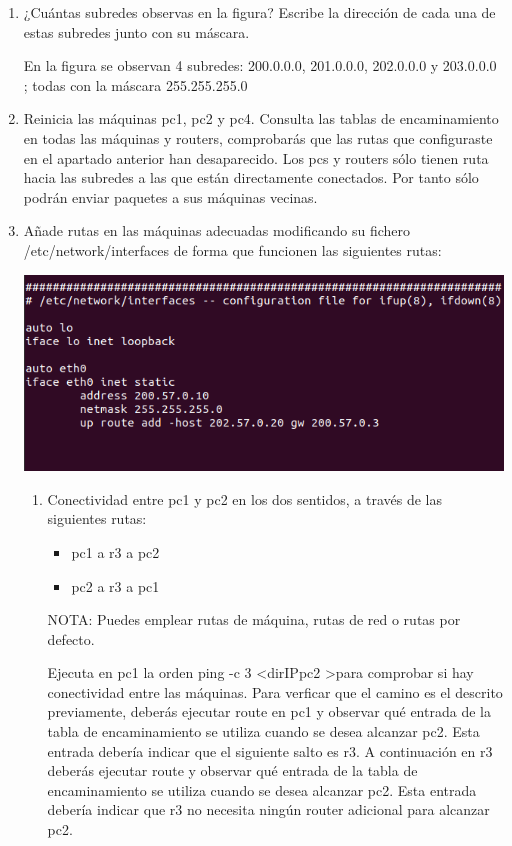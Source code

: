 \documentclass[12pt, a4paper]{report}
\begin{document}
\begin{enumerate}
	\item ¿Cuántas subredes observas en la figura? Escribe la dirección de cada una de estas subredes junto con su
	máscara.
	
	En la figura se observan 4 subredes: 200.0.0.0, 201.0.0.0, 202.0.0.0 y 203.0.0.0 ; todas con la máscara 255.255.255.0
	\item Reinicia las máquinas	pc1, pc2 y pc4.\newline
	Consulta las tablas de encaminamiento en todas las máquinas y
	routers, comprobarás
	que las rutas que
	configuraste en el apartado anterior han desaparecido. Los pcs y
	routers sólo tienen ruta
	hacia las subredes
	a las que están directamente conectados. Por tanto sólo podrán enviar paquetes a sus máquinas vecinas.
	\item Añade rutas en las máquinas adecuadas modificando su fichero /etc/network/interfaces de forma que funcionen las siguientes rutas:
	
	\includegraphics*[width=128mm, scale=0.5, center]{ejercicio4}
	
	\begin{enumerate}[label=\alph*]
		\item Conectividad entre pc1 y pc2 en los dos sentidos, a través de las siguientes rutas:
		\begin{itemize}
			\item pc1 a r3 a pc2			
			\item pc2 a r3 a pc1	
		\end{itemize}
		NOTA: Puedes emplear rutas de máquina, rutas de red o rutas por defecto.
		
		Ejecuta en
		pc1 la orden ping -c 3 \textless dirIPpc2 \textgreater para comprobar si hay conectividad entre las máquinas.
		Para verficar que el camino es el descrito previamente, deberás ejecutar
		route en pc1 y observar qué
		entrada de la tabla de encaminamiento se utiliza cuando se desea alcanzar pc2. Esta entrada debería
		indicar que el siguiente salto es r3. A continuación en r3 deberás ejecutar route y observar qué entrada
		de la tabla de encaminamiento se utiliza cuando se desea alcanzar pc2. Esta entrada debería indicar que
		r3 no necesita ningún router adicional para alcanzar pc2.
		

\end{enumerate}
\end{enumerate}
\end{document}
